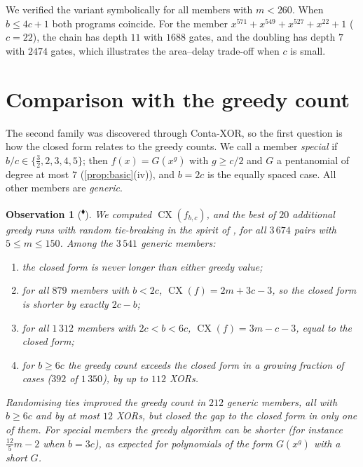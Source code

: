 \documentclass[11pt,a4paper]{article}
\theoremstyle{plain}
\newtheorem{observation}[theorem]{Observation}
\theoremstyle{definition}
\newcommand{\CX}{\operatorname{CX}}
\newcommand{\ours}{\textsuperscript{\textcolor{cblue}{$\blacklozenge$}}}
\begin{document}
We verified the variant symbolically for all members with $m<260$. When $b\le4c+1$ both
programs coincide. For the member $x^{571}+x^{549}+x^{527}+x^{22}+1$ ($c=22$), the chain
has depth $11$ with $1688$ gates, and the doubling has depth $7$ with $2474$ gates, which
illustrates the area--delay trade-off when $c$ is small.

\section{Comparison with the greedy count}\label{sec:greedy}

The second family was discovered through Conta-XOR, so the first question is how the
closed form relates to the greedy counts. We call a member \emph{special} if
$b/c\in\{\tfrac32,2,3,4,5\}$; then $f(x)=G(x^g)$ with $g\ge c/2$ and $G$ a pentanomial
of degree at most $7$ (\cref{prop:basic}(iv)), and $b=2c$ is the equally spaced case. All
other members are \emph{generic}.

\begin{observation}[\ours]\label{obs:greedy}
We computed $\CX(f_{b,c})$, and the best of $20$ additional greedy runs with random
tie-breaking in the spirit of \cite{TanPeyrin2020}, for all $3\,674$ pairs with
$5\le m\le150$. Among the $3\,541$ generic members:
\begin{enumerate}[label=(\alph*),itemsep=1pt]
  \item the closed form is never longer than either greedy value;
  \item for all $879$ members with $b<2c$, $\CX(f)=2m+3c-3$, so the closed form is
        shorter by exactly $2c-b$;
  \item for all $1\,312$ members with $2c<b<6c$, $\CX(f)=3m-c-3$, equal to the closed form;
  \item for $b\ge6c$ the greedy count exceeds the closed form in a growing fraction of
        cases ($392$ of $1\,350$), by up to $112$ XORs.
\end{enumerate}
Randomising ties improved the greedy count in $212$ generic members, all with $b\ge6c$
and by at most $12$ XORs, but closed the gap to the closed form in only one of them. For special members the greedy
algorithm can be shorter (for instance $\tfrac{12}{5}m-2$ when $b=3c$), as expected for
polynomials of the form $G(x^g)$ with a short $G$.
\end{observation}
\end{document}
